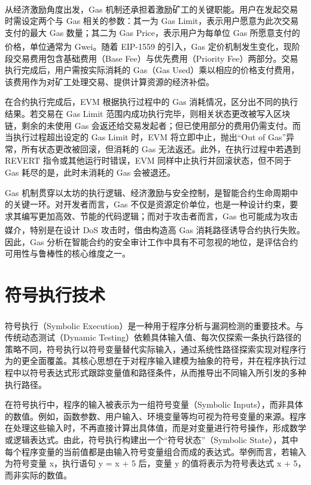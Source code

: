 \documentclass[print, master, vlined, timesmath]{DissertUESTC}
\begin{document}
从经济激励角度出发，Gas 机制还承担着激励矿工的关键职能\textsuperscript{\cite{...}}。用户在发起交易时需设定两个与 Gas 相关的参数：其一为 Gas Limit，表示用户愿意为此次交易支付的最大 Gas 数量；其二为 Gas Price，表示用户为每单位 Gas 所愿意支付的价格，单位通常为 Gwei。随着 EIP-1559 的引入\textsuperscript{\cite{...}}，Gas 定价机制发生变化，现阶段交易费用包含基础费用（Base Fee）与优先费用（Priority Fee）两部分。交易执行完成后，用户需按实际消耗的 Gas（Gas Used）乘以相应的价格支付费用，该费用作为对矿工处理交易、提供计算资源的经济补偿。

在合约执行完成后，EVM 根据执行过程中的 Gas 消耗情况，区分出不同的执行结果。若交易在 Gas Limit 范围内成功执行完毕，则相关状态更改被写入区块链，剩余的未使用 Gas 会返还给交易发起者；但已使用部分的费用仍需支付。而当执行过程超出设定的 Gas Limit 时，EVM 将立即中止，抛出“Out of Gas”异常，所有状态更改被回滚，但消耗的 Gas 无法返还。此外，在执行过程中若遇到 REVERT 指令或其他运行时错误，EVM 同样中止执行并回滚状态，但不同于 Gas 耗尽的是，此时未消耗的 Gas 会被退还。

Gas 机制贯穿以太坊的执行逻辑、经济激励与安全控制，是智能合约生命周期中的关键一环。对开发者而言，Gas 不仅是资源定价单位，也是一种设计约束，要求其编写更加高效、节能的代码逻辑；而对于攻击者而言，Gas 也可能成为攻击媒介，特别是在设计 DoS 攻击时，借由构造高 Gas 消耗路径诱导合约执行失败\textsuperscript{\cite{...}}。因此，Gas 分析在智能合约的安全审计工作中具有不可忽视的地位，是评估合约可用性与鲁棒性的核心维度之一。




\section{符号执行技术}

符号执行（Symbolic Execution）是一种用于程序分析与漏洞检测的重要技术\textsuperscript{\cite{...}}。与传统动态测试（Dynamic Testing）依赖具体输入值、每次仅探索一条执行路径的策略不同，符号执行以符号变量替代实际输入，通过系统性路径探索实现对程序行为的更全面覆盖。其核心思想在于对程序输入建模为抽象的符号，并在程序执行过程中以符号表达式形式跟踪变量值和路径条件，从而推导出不同输入所引发的多种执行路径。

在符号执行中，程序的输入被表示为一组符号变量（Symbolic Inputs），而非具体的数值。例如，函数参数、用户输入、环境变量等均可视为符号变量的来源。程序在处理这些输入时，不再直接计算出具体值，而是对变量进行符号操作，形成数学或逻辑表达式。由此，符号执行构建出一个“符号状态”（Symbolic State），其中每个程序变量的当前值都是由输入符号变量组合而成的表达式。举例而言，若输入为符号变量 x，执行语句 y = x + 5 后，变量 y 的值将表示为符号表达式 x + 5，而非实际的数值。
\end{document}
